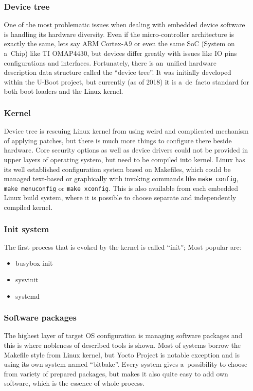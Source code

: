 \documentclass[printmode]{mgr}
\begin{document}
\subsubsection{Device tree}
One of the most problematic issues when dealing with embedded device software is handling its hardware diversity. Even if the micro-controller architecture is exactly the same, lets say ARM Cortex-A9 or even the same SoC (System on a~Chip) like TI OMAP4430, but devices differ greatly with issues like IO pins configurations and interfaces. Fortunately, there is an~unified hardware description data structure called the ``device tree''. It was initially developed within the U-Boot project, but currently (as of 2018) it is a~de~facto standard for both boot loaders and the Linux kernel.

\subsubsection{Kernel}
Device tree is rescuing Linux kernel from using weird and complicated mechanism of applying patches, but there is much more things to configure there beside hardware. Core security options as well as device drivers could not be provided in upper layers of operating system, but need to be compiled into kernel. Linux has its well established configuration system based on Makefiles, which could be managed text-based or graphically with invoking commands like \verb|make config|, \verb|make menuconfig| or \verb|make xconfig|. This is also available from each embedded Linux build system, where it is possible to choose separate and independently compiled kernel.

\subsubsection{Init system}

The first process that is evoked by the kernel is called ``init''; Most popular are:

\begin{itemize}
    \item busybox-init
    \item sysvinit
    \item systemd
\end{itemize}

\subsubsection{Software packages}
The highest layer of target OS configuration is managing software packages and this is where nobleness of described tools is shown. Most of systems borrow the Makefile style from Linux kernel, but Yocto Project is notable exception and is using its own system named ``bitbake''. Every system gives a~possibility to choose from variety of prepared packages, but makes it also quite easy to add own software, which is the essence of whole process.
\end{document}
